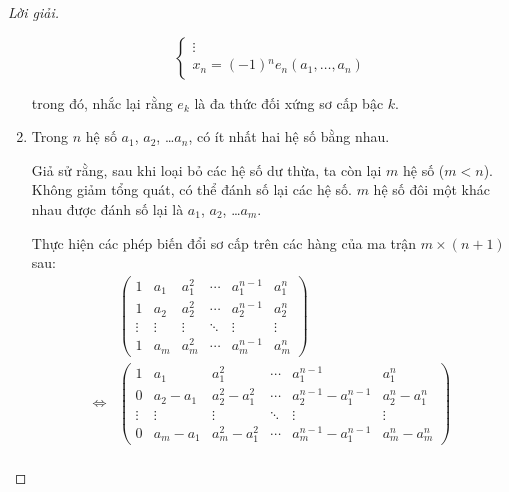 \documentclass[class=linear-algebra,crop=false]{standalone}
\begin{document}
\begin{proof}[Lời giải]
\begin{enumerate}[label = \textbf{Trường hợp \arabic*.},itemindent=2cm]
\[\begin{cases}
				      \vdots                                      \\
				      x_{n} = (-1){}^{n}e_{n}(a_{1},\ldots,a_{n})
			      \end{cases}
		      \]
		      \par trong đó, nhắc lại rằng $e_{k}$ là đa thức đối xứng sơ cấp bậc $k$.
		\item Trong $n$ hệ số $a_{1}$, $a_{2}$, \ldots $a_{n}$, có ít nhất hai hệ số bằng nhau.
		      \par Giả sử rằng, sau khi loại bỏ các hệ số dư thừa, ta còn lại $m$ hệ số ($m < n$). Không giảm tổng quát, có thể đánh số lại các hệ số. $m$ hệ số đôi một khác nhau được đánh số lại là $a_{1}$, $a_{2}$, \ldots $a_{m}$.
		      \par Thực hiện các phép biến đổi sơ cấp trên các hàng của ma trận $m\times(n+1)$ sau:
		      \begingroup{}
		      \allowdisplaybreaks{}
		      \begin{align*}
			                          &
			      \begin{pmatrix}
				      1      & a_{1}  & a_{1}^{2} & \cdots & a_{1}^{n-1} & a_{1}^{n} \\
				      1      & a_{2}  & a_{2}^{2} & \cdots & a_{2}^{n-1} & a_{2}^{n} \\
				      \vdots & \vdots & \vdots    & \ddots & \vdots      & \vdots    \\
				      1      & a_{m}  & a_{m}^{2} & \cdots & a_{m}^{n-1} & a_{m}^{n}
			      \end{pmatrix}                                                                                                                         \\
			      \Longleftrightarrow &
			      \begin{pmatrix}
				      1      & a_{1}         & a_{1}^{2}             & \cdots & a_{1}^{n-1}               & a_{1}^{n}             \\
				      0      & a_{2} - a_{1} & a_{2}^{2} - a_{1}^{2} & \cdots & a_{2}^{n-1} - a_{1}^{n-1} & a_{2}^{n} - a_{1}^{n} \\
				      \vdots & \vdots        & \vdots                & \ddots & \vdots                    & \vdots                \\
				      0      & a_{m} - a_{1} & a_{m}^{2} - a_{1}^{2} & \cdots & a_{m}^{n-1} - a_{1}^{n-1} & a_{m}^{n} - a_{m}^{n}
			      \end{pmatrix}                                                                            \\

\end{align*}
\end{enumerate}
\end{proof}
\end{document}
